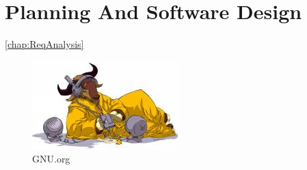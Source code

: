 \newpage
\chapter{Planning And Software Design}
\ref{chap:ReqAnalysis}


\begin{figure}[htbp]
	\centering	\includegraphics{grafiken/listen-tiny.jpg}
	\caption{GNU.org}
	\label{fig:Gnu}
\end{figure}
